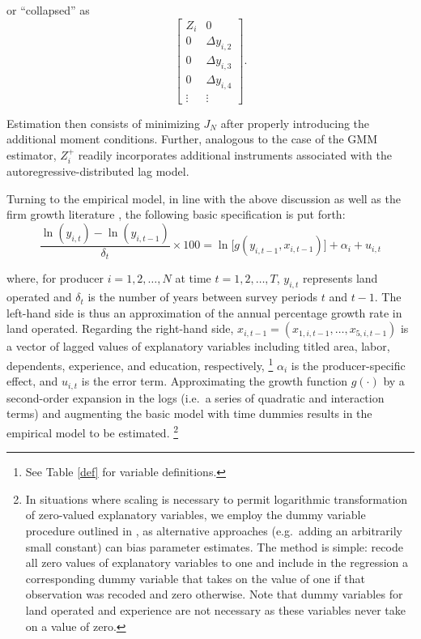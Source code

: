 \documentclass[english]{article}
\begin{document}
\noindent
or ``collapsed'' as
\begin{equation}
\left[ 
\begin{array}{ccccccc}
Z_i  & 0  \\
0 & \Delta y_{i,2}  \\
0 & \Delta y_{i,3}  \\
0 & \Delta y_{i,4}  \\
\vdots & \vdots 
\end{array}
\right].
\label{zcnew}
\end{equation}

\noindent
Estimation then consists of minimizing $J_N$ after properly introducing the 
additional moment conditions. 
Further, analogous to the case of the \citeauthor{arellano1991} GMM 
estimator, $Z_{i}^{+}$ readily incorporates additional instruments 
associated with the autoregressive-distributed lag model.

Turning to the empirical model, in line with the above discussion as well as 
the firm growth literature
\citep{evans1987, sleuwaegen2002, rizov2003, dries2004b}, the following 
basic specification is put forth:
\begin{equation}
\frac{\ln (y_{i,t}) - \ln(y_{i,t-1})}{\delta_t} \times 100 = \ln 
\big[g(y_{i,t-1}, x_{i,t-1})\big] + \alpha_i + u_{i,t}
\label{emodel}
\end{equation}

\noindent
where, for producer $i=1,2,\ldots,N$ at time $t=1,2,\ldots,T$, $y_{i,t}$
represents land operated and $\delta_t$ is the number of years between 
survey periods $t$ and $t-1$. 
The left-hand side is thus an approximation of the annual percentage growth 
rate in land operated. 
Regarding the right-hand side, $x_{i,t-1} = (x_{1,i,t-1}, \ldots, x_{5,i,t-1} )$ 
is a vector of lagged values of explanatory variables including titled area, 
labor, dependents, experience, and education, respectively,%
\footnote{See Table \ref{def} for variable definitions.} 
$\alpha_i$ is the producer-specific effect, and $u_{i,t}$ is the error term. 
Approximating the growth function $g(\cdot)$ by a second-order expansion 
in the logs (i.e.\ a series of quadratic and interaction terms) and augmenting 
the basic model with time dummies results in the empirical model to be 
estimated.%
\footnote{\label{note: zvdum}In situations where scaling is necessary to 
permit logarithmic transformation of zero-valued explanatory variables, 
we employ the dummy variable procedure outlined in \citet{battese1997}, 
as alternative approaches (e.g.\ adding an arbitrarily small constant) can bias 
parameter estimates.
The method is simple: recode all zero values of explanatory variables to one 
and include in the regression a corresponding dummy variable that takes on 
the value of one if that observation was recoded and zero otherwise. 
Note that dummy variables for land operated and experience are not 
necessary as these variables never take on a value of zero.}
\end{document}

